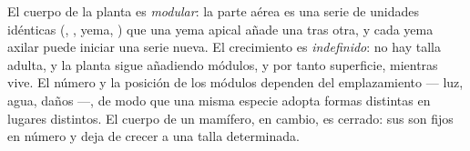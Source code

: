 \begin{proposition}\label{prop:b1:flowering-plant-organization:modular}
El cuerpo de la planta es \emph{modular}: la
parte aérea es una serie de unidades idénticas (, , yema,
) que una yema apical añade una tras otra, y cada yema axilar
puede iniciar una serie nueva. El crecimiento es
\emph{indefinido}: no hay talla adulta, y la
planta sigue añadiendo módulos, y por tanto superficie, mientras vive. El
número y la posición de los módulos dependen del emplazamiento --- luz,
agua, daños ---, de modo que una misma especie adopta formas distintas en
lugares distintos. El cuerpo de un mamífero, en cambio, es cerrado: sus
 son fijos en número y deja de crecer a una talla determinada.
\end{proposition}

